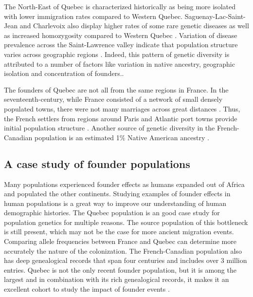\documentclass[
11pt, %
oneside, %
english, %
doublespacing, %
headsepline, %
chapterinoneline, %
]{MastersDoctoralThesis} %
\begin{document}
The North-East of Quebec is characterized historically as being more isolated with lower immigration rates compared to Western Quebec.
Saguenay-Lac-Saint-Jean and Charlevoix also display higher rates of some rare genetic diseases as well as increased homozygosity compared to Western Quebec \citep{Gagnon2001}.
Variation of disease prevalence across the Saint-Lawrence valley indicate that population structure varies across geographic regions \citep{Gagnon2001}.
Indeed, this pattern of genetic diversity is attributed to a number of factors like variation in native ancestry, geographic isolation and concentration of founders.\citep{Gagnon2001,Laberge2005,Bherer2011}.

The founders of Quebec are not all from the same regions in France.
In the seventeenth-century, while France consisted of a network of small densely populated towns, there were not many marriages across great distances \citep{Laberge2005}.
Thus, the French settlers from regions around Paris and Atlantic port towns provide initial population structure \citep{Laberge2005}.
Another source of genetic diversity in the French-Canadian population is an estimated 1\% Native American ancestry \citep{Moreau2013}.

\subsection{A case study of founder populations}

Many populations experienced founder effects as humans expanded out of Africa and populated the other continents.
Studying examples of founder effects in human populations is a great way to improve our understanding of human demographic histories.
The Quebec population is an good case study for population genetics for multiple reasons.
The source population of this bottleneck is still present, which may not be the case for more ancient migration events. 
Comparing allele frequencies between France and Quebec can determine more accurately the nature of the colonization.
The French-Canadian population also has deep genealogical records that span four centuries and includes over 3 million entries.
Quebec is not the only recent founder population, but it is among the largest and in combination with its rich genealogical records, it makes it an excellent cohort to study the impact of founder events \citep{Larmuseau2013,Bherer2011,Gagnon2001,Roy-Gagnon2011}.
\end{document}
